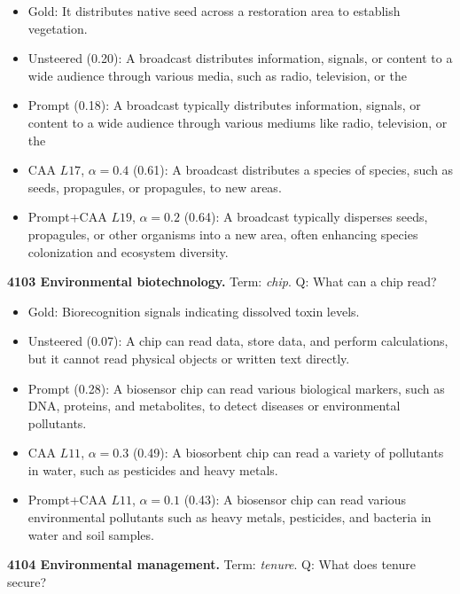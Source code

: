 \begin{itemize}\setlength{\itemsep}{0.15em}\setlength{\parsep}{0pt}\setlength{\topsep}{0.2em}
\item Gold: It distributes native seed across a restoration area to establish vegetation.
\item Unsteered (0.20): A broadcast distributes information, signals, or content to a wide audience through various media, such as radio, television, or the
\item Prompt (0.18): A broadcast typically distributes information, signals, or content to a wide audience through various mediums like radio, television, or the
\item CAA $L17$, $\alpha=0.4$ (0.61): A broadcast distributes a species of species, such as seeds, propagules, or propagules, to new areas.
\item Prompt+CAA $L19$, $\alpha=0.2$ (0.64): A broadcast typically disperses seeds, propagules, or other organisms into a new area, often enhancing species colonization and ecosystem diversity.
\end{itemize}
\medskip\noindent\textbf{4103 Environmental biotechnology.} Term: \emph{chip}.
Q: What can a chip read?
\begin{itemize}\setlength{\itemsep}{0.15em}\setlength{\parsep}{0pt}\setlength{\topsep}{0.2em}
\item Gold: Biorecognition signals indicating dissolved toxin levels.
\item Unsteered (0.07): A chip can read data, store data, and perform calculations, but it cannot read physical objects or written text directly.
\item Prompt (0.28): A biosensor chip can read various biological markers, such as DNA, proteins, and metabolites, to detect diseases or environmental pollutants.
\item CAA $L11$, $\alpha=0.3$ (0.49): A biosorbent chip can read a variety of pollutants in water, such as pesticides and heavy metals.
\item Prompt+CAA $L11$, $\alpha=0.1$ (0.43): A biosensor chip can read various environmental pollutants such as heavy metals, pesticides, and bacteria in water and soil samples.
\end{itemize}
\medskip\noindent\textbf{4104 Environmental management.} Term: \emph{tenure}.
Q: What does tenure secure?
